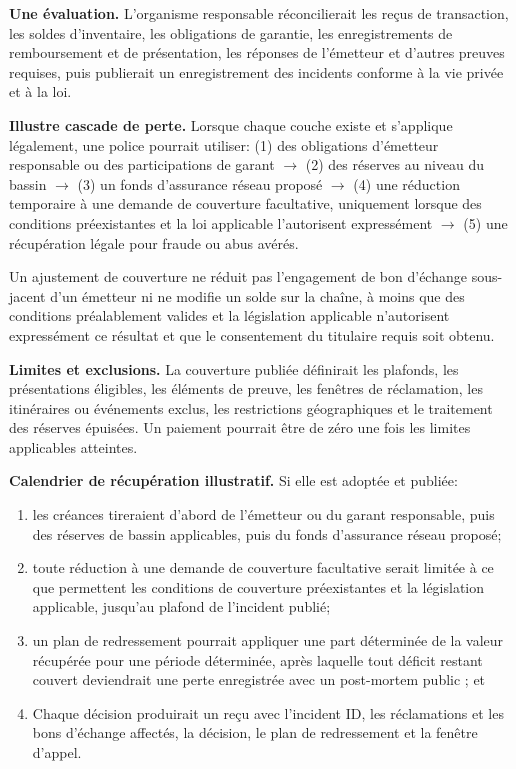 \documentclass[11pt]{article}
\begin{document}
\textbf{Une évaluation.} L'organisme responsable réconcilierait les reçus de transaction, les soldes d'inventaire, les obligations de garantie, les enregistrements de remboursement et de présentation, les réponses de l'émetteur et d'autres preuves requises, puis publierait un enregistrement des incidents conforme à la vie privée et à la loi.

\textbf{Illustre cascade de perte.} Lorsque chaque couche existe et s'applique légalement, une police pourrait utiliser: (1) des obligations d'émetteur responsable ou des participations de garant $\to$ (2) des réserves au niveau du bassin $\to$ (3) un fonds d'assurance réseau proposé $\to$ (4) une réduction temporaire à une demande de couverture facultative, uniquement lorsque des conditions préexistantes et la loi applicable l'autorisent expressément $\to$ (5) une récupération légale pour fraude ou abus avérés.

Un ajustement de couverture ne réduit pas l'engagement de bon d'échange sous-jacent d'un émetteur ni ne modifie un solde sur la chaîne, à moins que des conditions préalablement valides et la législation applicable n'autorisent expressément ce résultat et que le consentement du titulaire requis soit obtenu.

\textbf{Limites et exclusions.} La couverture publiée définirait les plafonds, les présentations éligibles, les éléments de preuve, les fenêtres de réclamation, les itinéraires ou événements exclus, les restrictions géographiques et le traitement des réserves épuisées. Un paiement pourrait être de zéro une fois les limites applicables atteintes.

\textbf{Calendrier de récupération illustratif.} Si elle est adoptée et publiée:

\begin{enumerate}[leftmargin=*]
\item les créances tireraient d'abord de l'émetteur ou du garant responsable, puis des réserves de bassin applicables, puis du fonds d'assurance réseau proposé;
\item toute réduction à une demande de couverture facultative serait limitée à ce que permettent les conditions de couverture préexistantes et la législation applicable, jusqu'au plafond de l'incident publié;
\item un plan de redressement pourrait appliquer une part déterminée de la valeur récupérée pour une période déterminée, après laquelle tout déficit restant couvert deviendrait une perte enregistrée avec un post-mortem public ; et
\item Chaque décision produirait un reçu avec l'incident ID, les réclamations et les bons d'échange affectés, la décision, le plan de redressement et la fenêtre d'appel.
\end{enumerate}
\end{document}
